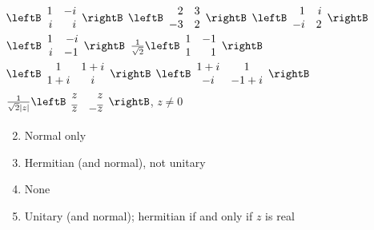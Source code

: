 \begin{multicols}{2}
\begin{ex}
\begin{exenumerate}[column-sep=-15pt]
\exitem $\leftB \begin{array}{rr}
1 & -i \\
i & i
\end{array}\rightB$
\exitem $\leftB \begin{array}{rr}
2 & 3 \\
-3 & 2
\end{array}\rightB$
\exitem $\leftB \begin{array}{rr}
1 & i \\
-i & 2
\end{array}\rightB$
\exitem $\leftB \begin{array}{rr}
1 & -i \\
i & -1
\end{array}\rightB$
\exitem $\frac{1}{\sqrt{2}} \leftB \begin{array}{rr}
1 & -1 \\
1 & 1
\end{array}\rightB$
\exitem $\leftB \begin{array}{cc}
1 & 1 + i \\
1 + i & i
\end{array}\rightB$
\exitem $\leftB \begin{array}{cc}
1 + i & 1 \\
-i & -1 + i
\end{array}\rightB$
\exitem $\frac{1}{\sqrt{2}|z|}\leftB \begin{array}{rr}
z & z \\
\overline{z} & -\overline{z}
\end{array}\rightB$, $z \neq 0$
\end{exenumerate}
\begin{sol}
\begin{enumerate}[label={\alph*.}]
\setcounter{enumi}{1}
\item  Normal only

\setcounter{enumi}{3}
\item  Hermitian (and normal), not unitary

\setcounter{enumi}{5}
\item  None

\setcounter{enumi}{7}
\item  Unitary (and normal); hermitian if and only if $z$ is real

\end{enumerate}
\end{sol}
\end{ex}


\end{multicols}
